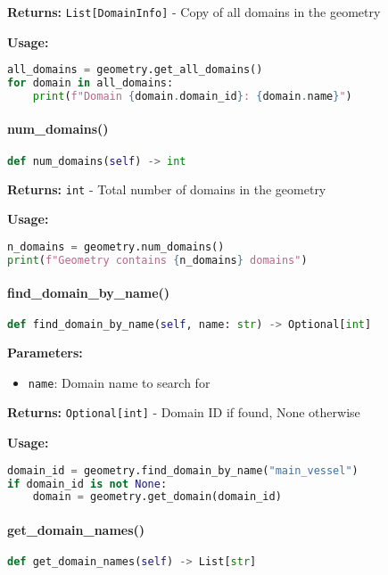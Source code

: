 \textbf{Returns:} \texttt{List[DomainInfo]} - Copy of all domains in the geometry

\textbf{Usage:}
\begin{lstlisting}[language=Python]
all_domains = geometry.get_all_domains()
for domain in all_domains:
    print(f"Domain {domain.domain_id}: {domain.name}")
\end{lstlisting}

\paragraph{num\_domains()}
\begin{lstlisting}[language=Python, caption=Number of Domains Method]
def num_domains(self) -> int
\end{lstlisting}

\textbf{Returns:} \texttt{int} - Total number of domains in the geometry

\textbf{Usage:}
\begin{lstlisting}[language=Python]
n_domains = geometry.num_domains()
print(f"Geometry contains {n_domains} domains")
\end{lstlisting}

\paragraph{find\_domain\_by\_name()}
\begin{lstlisting}[language=Python, caption=Find Domain by Name Method]
def find_domain_by_name(self, name: str) -> Optional[int]
\end{lstlisting}

\textbf{Parameters:}
\begin{itemize}
    \item \texttt{name}: Domain name to search for
\end{itemize}

\textbf{Returns:} \texttt{Optional[int]} - Domain ID if found, None otherwise

\textbf{Usage:}
\begin{lstlisting}[language=Python]
domain_id = geometry.find_domain_by_name("main_vessel")
if domain_id is not None:
    domain = geometry.get_domain(domain_id)
\end{lstlisting}

\paragraph{get\_domain\_names()}
\begin{lstlisting}[language=Python, caption=Get Domain Names Method]
def get_domain_names(self) -> List[str]
\end{lstlisting}

